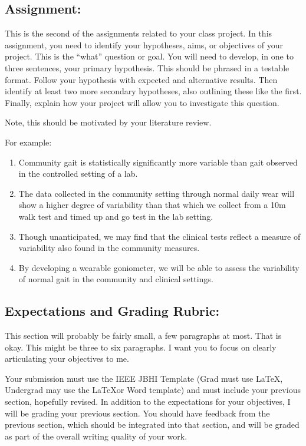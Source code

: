 \documentclass[11pt]{article}
\begin{document}
\subsection*{Assignment:}
This is the second of the assignments related to your class project. In this assignment, you need to identify your hypotheses, aims, or objectives of your project. This is the ``what'' question or goal. You will need to develop, in one to three sentences, your primary hypothesis. This should be phrased in a testable format. Follow your hypothesis with expected and alternative results. Then identify at least two more secondary hypotheses, also outlining these like the first. Finally, explain how your project will allow you to investigate this question.

Note, this should be motivated by your literature review.

For example:
\begin{enumerate}
    \item[Hypo:] Community gait is statistically significantly   more variable than gait observed in the controlled setting of a lab.
    \item[Exp:] The data collected in the community setting through normal daily wear will show a higher degree of variability than that which we collect from a 10m walk test and timed up and go test in the lab setting.
    \item[Alt:] Though unanticipated, we may find that the clinical tests reflect a measure of variability also found in the community measures.
    \item[Interp:] By developing a wearable goniometer, we will be able to assess the variability of normal gait in the community and clinical settings.
\end{enumerate}


\subsection*{Expectations and Grading Rubric:}
This section will probably be fairly small, a few paragraphs at most.  That is okay. This might be three to six paragraphs. I want you to focus on clearly articulating your objectives to me.

Your submission must use the IEEE JBHI Template (Grad must use \LaTeX, Undergrad may use the \LaTeX or Word template) and must include your previous section, hopefully revised. In addition to the expectations for your objectives, I will be grading your previous section.  You should have feedback from the previous section, which should be integrated into that section, and will be graded as part of the overall writing quality of your work.
\end{document}
